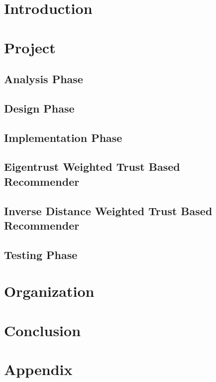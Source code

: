 \documentclass[12pt]{article}
\begin{document}
	\begingroup
	\hypersetup{hidelinks}
	\tableofcontents
	\endgroup
          
	\newpage
	
	\section{Introduction}
	

	\section{Project}
	

	\subsection{Analysis Phase}
	
	
	\subsection{Design Phase}
	
	
	\subsection{Implementation Phase}
	
	
	\subsection{Eigentrust Weighted Trust Based Recommender}
	
	
	\subsection{Inverse Distance Weighted Trust Based Recommender}
	
	
	\subsection{Testing Phase}
	
	
	\section{Organization}
	
	
	\section{Conclusion}
	

	\section{Appendix}
	
	
	\newpage
	
	
	
	
	
\end{document}
